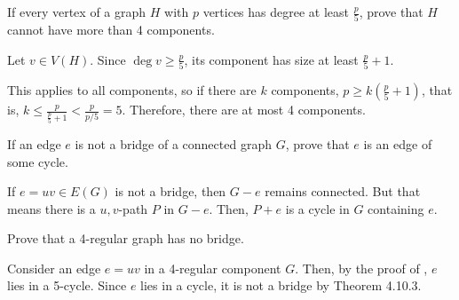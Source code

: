 \begin{xca}
  If every vertex of a graph $H$ with $p$ vertices has degree at least $\frac{p}{5}$,
  prove that $H$ cannot have more than 4 components.
\end{xca}
\begin{prf}
  Let $v \in V(H)$. Since $\deg v \geq \frac{p}{5}$,
  its component has size at least $\frac{p}{5} + 1$.

  This applies to all components, so if there are $k$ components,
  $p \geq k(\frac{p}{5}+1)$, that is, $k \leq \frac{p}{\frac{p}{5}+1} < \frac{p}{p/5} = 5$.
  Therefore, there are at most 4 components.
\end{prf}

\begin{xca}
  If an edge $e$ is not a bridge of a connected graph $G$,
  prove that $e$ is an edge of some cycle.
\end{xca}
\begin{prf}
  If $e = uv \in E(G)$ is not a bridge, then $G - e$ remains connected.
  But that means there is a $u,v$-path $P$ in $G - e$.
  Then, $P + e$ is a cycle in $G$ containing $e$.
\end{prf}

\begin{xca}
  Prove that a 4-regular graph has no bridge.
\end{xca}
\begin{prf}
  Consider an edge $e = uv$ in a 4-regular component $G$.
  Then, by the proof of , $e$ lies in a 5-cycle.
  Since $e$ lies in a cycle, it is not a bridge by Theorem 4.10.3.
\end{prf}

